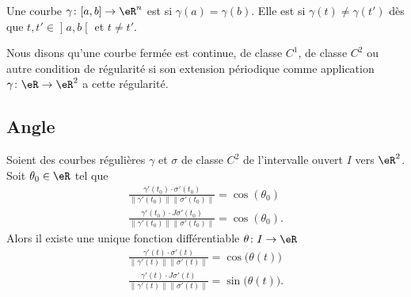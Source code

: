 \begin{definition}
    Une courbe \( \gamma\colon \mathopen[ a , b \mathclose]\to \eR^n\) est  si \( \gamma(a)=\gamma(b)\). Elle est  si \( \gamma(t)\neq \gamma(t')\) dès que \( t,t'\in\mathopen] a , b \mathclose[\) et \( t\neq  t'\).
\end{definition}

\begin{definition}      \label{DEFooSAZTooZGQrQG}
    Nous disons qu'une courbe fermée est continue, de classe \( C^1\), de classe \( C^2\) ou autre condition de régularité si son extension périodique comme application \( \gamma\colon \eR\to \eR^2\) a cette régularité.
\end{definition}

\subsection{Angle}

\begin{lemma}        \label{LEMooUECMooNBDGiR}
    Soient des courbes régulières \( \gamma\) et \( \sigma\) de classe \( C^2\) de l'intervalle ouvert \( I\) vers \( \eR^2\). Soit \( \theta_0\in \eR\) tel que
    \begin{subequations}
        \begin{align}
            \frac{ \gamma'(t_0)\cdot\sigma'(t_0) }{ \| \gamma'(t_0) \|\| \sigma'(t_0) \| }=\cos(\theta_0)\\
            \frac{ \gamma'(t_0)\cdot J\sigma'(t_0) }{ \| \gamma'(t_0) \|\| \sigma'(t_0) \| }=\cos(\theta_0).
        \end{align}
    \end{subequations}
    Alors il existe une unique fonction différentiable \( \theta\colon I\to \eR\)
    \begin{subequations}
        \begin{align}
            \frac{ \gamma'(t)\cdot\sigma'(t) }{ \| \gamma'(t) \|\| \sigma'(t) \| }=\cos\big( \theta(t) \big)\\
            \frac{ \gamma'(t)\cdot J\sigma'(t) }{ \| \gamma'(t) \|\| \sigma'(t) \| }=\sin\big( \theta(t) \big).
        \end{align}
    \end{subequations}
\end{lemma}

